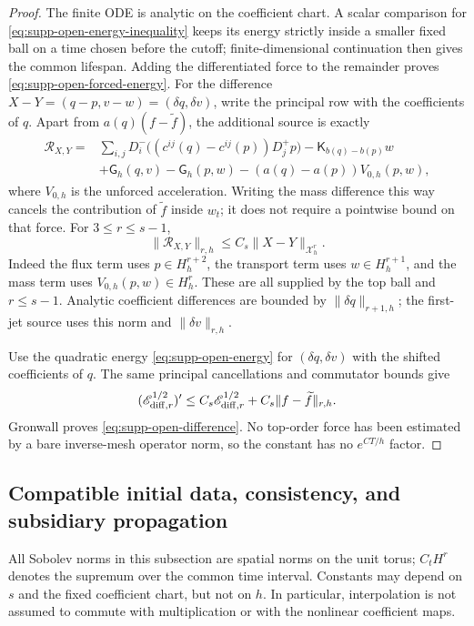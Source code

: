 \documentclass[11pt]{article}
\numberwithin{equation}{section}
\theoremstyle{definition}
\theoremstyle{remark}
\begin{document}
\begin{proof}
The finite ODE is analytic on the coefficient chart.  A scalar comparison for
\eqref{eq:supp-open-energy-inequality} keeps its energy strictly inside a
smaller fixed ball on a time chosen before the cutoff; finite-dimensional
continuation then gives the common lifespan.  Adding the differentiated force
to the remainder proves \eqref{eq:supp-open-forced-energy}.
For the difference $X-Y=(q-p,v-w)=(\delta q,\delta v)$, write the principal
row with the coefficients of $q$.  Apart from $a(q)(f-\widetilde f)$,
the additional source is exactly
\begin{equation}
 \begin{split}
 \mathcal R_{X,Y}={}&
 \sum_{i,j}D_i^-\bigl((c^{ij}(q)-c^{ij}(p))D_j^+p\bigr)
 -\mathsf K_{b(q)-b(p)}w\\
 &+\mathsf G_h(q,v)-\mathsf G_h(p,w)
       -(a(q)-a(p))V_{0,h}(p,w),
 \end{split}
 \label{eq:supp-open-difference-source}
\end{equation}
where $V_{0,h}$ is the unforced acceleration.  Writing the mass difference
this way cancels the contribution of $\widetilde f$ inside $w_t$; it does
not require a pointwise bound on that force.  For $3\le r\le s-1$,
\[
 \|\mathcal R_{X,Y}\|_{r,h}
 \le C_s\|X-Y\|_{\mathcal X_h^r}.
\]
Indeed the flux term uses $p\in H_h^{r+2}$, the transport term uses
$w\in H_h^{r+1}$, and the mass term uses
$V_{0,h}(p,w)\in H_h^r$.  These are all supplied by the top ball and
$r\le s-1$.  Analytic coefficient differences are bounded by
$\|\delta q\|_{r+1,h}$; the first-jet source uses this norm and
$\|\delta v\|_{r,h}$.

Use the quadratic energy \eqref{eq:supp-open-energy} for
$(\delta q,\delta v)$ with the shifted coefficients of $q$.
The same principal cancellations and commutator bounds give
\[
 (\mathscr E_{{\rm diff},r}^{1/2})'
 \le C_s\mathscr E_{{\rm diff},r}^{1/2}
                         +C_s\|f-\widetilde f\|_{r,h}.
\]
Gronwall proves \eqref{eq:supp-open-difference}.  No top-order force has
been estimated by a bare inverse-mesh operator norm, so the constant has
no $e^{CT/h}$ factor.
\end{proof}

\subsection{Compatible initial data, consistency, and subsidiary propagation}

All Sobolev norms in this subsection are spatial norms on the unit torus;
$C_tH^r$ denotes the supremum over the common time interval.  Constants may
depend on $s$ and the fixed coefficient chart, but not on $h$.  In
particular, interpolation is not assumed to commute with multiplication or
with the nonlinear coefficient maps.
\end{document}
